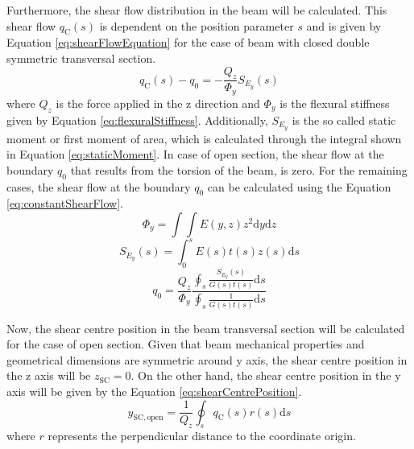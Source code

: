 Furthermore, the shear flow distribution in the beam will be calculated. This shear flow $q_\mathrm{C}(s)$ is dependent on the position parameter $s$ and is given by Equation \ref{eq:shearFlowEquation} for the case of beam with closed double symmetric transversal section.
%
\begin{equation}\label{eq:shearFlowEquation}
  q_\mathrm{C}(s) - q_0 = - \frac{Q_z}{\Phi_y} S_{E_y}(s)
\end{equation}
%
where $Q_z$ is the force applied in the z direction and $\Phi_y$ is the flexural stiffness given by Equation \ref{eq:flexuralStiffness}. Additionally, $S_{E_y}$ is the so called static moment or first moment of area, which is calculated through the integral shown in Equation \ref{eq:staticMoment}. In case of open section, the shear flow at the boundary $q_0$ that results from the torsion of the beam, is zero. For the remaining cases, the shear flow at the boundary $q_0$ can be calculated using the Equation \ref{eq:constantShearFlow}.
%
\begin{equation}\label{eq:flexuralStiffness}
  \Phi_y = \int \int E(y,z) z^2 \mathrm{d}y \mathrm{d}z
\end{equation}
%
\begin{equation}\label{eq:staticMoment}
  S_{E_y}(s) = \int_0^s E(s) t(s) z(s) \mathrm{d}s
\end{equation}
%
\begin{equation}\label{eq:constantShearFlow}
  q_0 = \frac{Q_z}{\Phi_y} \frac{ \oint_s \frac{S_{E_y}(s)}{G(s) t(s)} \mathrm{d}s }{ \oint_s \frac{1}{G(s) t(s)} \mathrm{d}s }
\end{equation}

Now, the shear centre position in the beam transversal section will be calculated for the case of open section. Given that beam mechanical properties and geometrical dimensions are symmetric around y axis, the shear centre position in the z axis will be $z_{\mathrm{SC}} = 0$. On the other hand, the shear centre position in the y axis will be given by the Equation \ref{eq:shearCentrePosition}.
%
\begin{equation}\label{eq:shearCentrePosition}
  y_{\mathrm{SC,open}} = \frac{1}{Q_z} \oint_s q_\mathrm{C}(s) r(s) \mathrm{d}s
\end{equation}
%
where $r$ represents the perpendicular distance to the coordinate origin.

